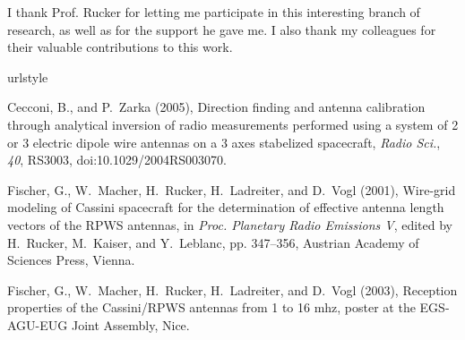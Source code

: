 \documentclass[galley,ras]{agu2001}
\begin{document}
\begin{article}
\begin{acknowledgments}
I thank Prof. Rucker for letting me participate in this interesting branch of research, as well as for the support he gave me. I also thank my colleagues for their valuable contributions to this work.
\end{acknowledgments}

%
%
%
%
%
%
%
%


\begin{thebibliography}{}

\providecommand{\natexlab}[1]{#1} \expandafter\ifx\csname urlstyle\endcsname\relax  \providecommand{\doi}[1]{doi:\discretionary{}{}{}#1}\else  \providecommand{\doi}{doi:\discretionary{}{}{}\begingroup  \urlstyle{rm}\Url}\fi


 Cecconi, B., and P.~Zarka (2005), Direction finding and antenna calibration  through analytical inversion of radio measurements performed using a system  of 2 or 3 electric dipole wire antennas on a 3 axes stabelized spacecraft,  \textit{ Radio Sci.}, \textit{40}, RS3003, doi:10.1029/2004RS003070.



 Fischer, G., W.~Macher, H.~Rucker, H.~Ladreiter, and D.~Vogl (2001), Wire-grid  modeling of Cassini spacecraft for the determination of effective antenna  length vectors of the RPWS antennas, in \textit{Proc. Planetary Radio  Emissions V}, edited by H.~Rucker, M.~Kaiser, and Y.~Leblanc, pp. 347--356,  Austrian Academy of Sciences Press, Vienna.

 Fischer, G., W.~Macher, H.~Rucker, H.~Ladreiter, and D.~Vogl (2003), Reception  properties of the Cassini/RPWS antennas from 1 to 16 mhz, poster at the  EGS-AGU-EUG Joint Assembly, Nice.



\end{thebibliography}
\end{article}
\end{document}
